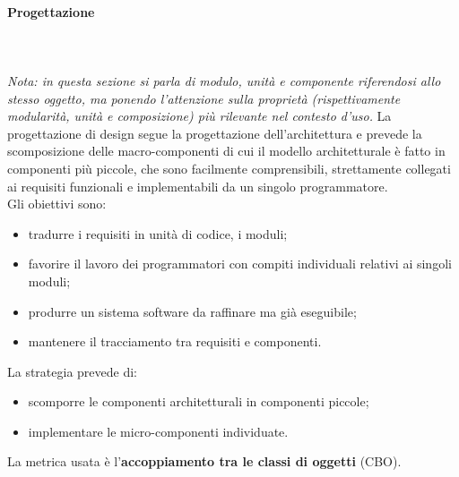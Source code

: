 \paragraph{Progettazione} \mbox{}\\ \mbox{}\\
\textit{Nota: in questa sezione si parla di modulo, unità e componente riferendosi allo stesso oggetto, ma ponendo l'attenzione sulla proprietà (rispettivamente modularità, unità e composizione) più rilevante nel contesto d'uso.}\newline 
La progettazione di design segue la progettazione dell'architettura e prevede la scomposizione delle macro-componenti di cui il modello architetturale è fatto in componenti più piccole, che sono facilmente comprensibili, strettamente collegati ai requisiti funzionali e implementabili da un singolo programmatore.\\
Gli obiettivi sono:
\begin{itemize}
	\item tradurre i requisiti in unità di codice, i moduli;
	\item favorire il lavoro dei programmatori con compiti individuali relativi ai singoli moduli;
	\item produrre un sistema software da raffinare ma già eseguibile;
	\item mantenere il tracciamento tra requisiti e componenti.
\end{itemize}
La strategia prevede di: 
\begin{itemize}
	\item scomporre le componenti architetturali in componenti piccole;
	\item implementare le micro-componenti individuate.
\end{itemize}
La metrica usata è l'\textbf{accoppiamento tra le classi di oggetti} (CBO).
